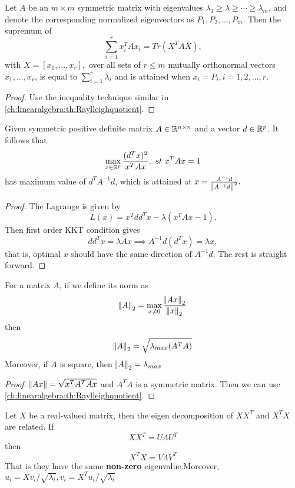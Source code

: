 \begin{refsection}
\begin{corollary}
Let $A$ be an $m\times m$ symmetric matrix with eigenvalues $\lambda_1\geq \lambda \geq \cdots \geq \lambda_m$, and denote the corresponding normalized eigenvectors as $P_1,P_2, ...,P_m$. Then the supremum of $$\sum_{i=1}^r x_i^TAx_i = Tr(X^TAX),$$
with $X= [x_1,...,x_r],$ over all sets of $r\leq m$ mutually orthonormal vectors $x_1,...,x_r$, is equal to $\sum_{i=1}^r \lambda_i$ and is attained when $x_i = P_i, i=1,2,..., r$. 	
\end{corollary}
\begin{proof}
Use the inequality technique similar in \autoref{ch:linearalgebra:th:Raylleighquotient}.
\end{proof}

\begin{corollary}
	Given symmetric positive definite matrix $A\in \mathbb{R}^{n\times n}$ and a vector $d\in \mathbb{R}^p$. It follows that
	$$\max_{x\in\mathbb{R}^p} \frac{(d^T x)^2 }{x^TAx}, ~st~ x^TAx = 1$$
	has maximum value of $d^TA^{-1}d$, which is attained at $x = \frac{A^{-1}d}{\norm{A^{-1}d}^2}.$	
\end{corollary}
\begin{proof}
	The Lagrange is given by
	$$L(x) = x^Tdd^Tx - \lambda (x^TAx - 1).$$
	Then first order KKT condition gives
	$$dd^T x = \lambda Ax \implies A^{-1}d (d^Tx) = \lambda x,$$
	that is, optimal $x$ should have the same direction of $A^{-1}d$. The rest is straight forward. 
\end{proof}

\begin{corollary}\label{ch:linearalgebra:th:matrix2normeigenvalue}
	For a matrix $A$, if we define its norm as
	$$\norm{A}_2 = \max_{x\neq 0} \frac{\norm{Ax}_2}{\norm{x}_2}$$
	then
	$$\norm{A}_2 = \sqrt{\lambda_{max}(A^TA)}$$
	Moreover, if $A$ is square, then $\norm{A}_2 = \lambda_{max}$
\end{corollary}

\begin{proof}
	$\norm{Ax} = \sqrt{x^TA^TAx}$ and $A^TA$  is a symmetric matrix. Then we can use \autoref{ch:linearalgebra:th:Raylleighquotient}.
\end{proof}


\begin{theorem}\label{ch:linearalgebra:th:spectralpropertiesofXXTandXTX}
	Let $X$ be a real-valued matrix, then the eigen decomposition of $XX^T$ and $X^TX$ are related. If
	$$XX^T = U\Lambda U^T$$
	then
	$$X^TX = V\Lambda V^T$$
	That is they have the same \textbf{non-zero} eigenvalue.Moreover,
	$u_i = Xv_i/\sqrt{\lambda_i}, v_i = X^Tu_i/\sqrt{\lambda_i}$
\end{theorem}


\end{refsection}
